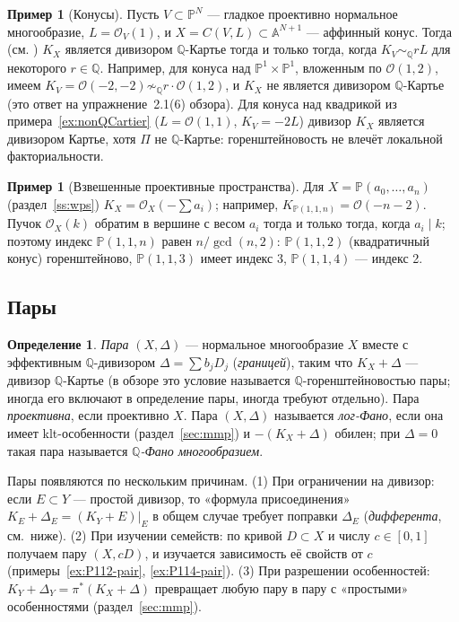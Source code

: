 \documentclass[11pt,a4paper]{article}
\theoremstyle{plain}
\theoremstyle{definition}
\newtheorem{definition}[theorem]{Определение}
\newtheorem{example}[theorem]{Пример}
\theoremstyle{remark}
\newcommand{\Q}{\mathbb{Q}}
\newcommand{\PP}{\mathbb{P}}
\newcommand{\A}{\mathbb{A}}
\newcommand{\cO}{\mathcal{O}}
\begin{document}
\begin{example}[Конусы]\label{ex:cone-canonical}
Пусть $V\subset\PP^N$ --- гладкое проективно нормальное многообразие, $L=\cO_V(1)$, и
$X=C(V,L)\subset\A^{N+1}$ --- аффинный конус. Тогда (см. \cite[3.1]{KolSing}) $K_X$ является
дивизором $\Q$-Картье тогда и только тогда, когда $K_V\sim_\Q rL$ для некоторого $r\in\Q$. Например,
для конуса над $\PP^1\times\PP^1$, вложенным по $\cO(1,2)$, имеем $K_V=\cO(-2,-2)\not\sim_\Q
r\cdot\cO(1,2)$, и $K_X$ не является дивизором $\Q$-Картье (это ответ на упражнение~2.1(6) обзора). Для конуса над
квадрикой из примера~\ref{ex:nonQCartier} ($L=\cO(1,1)$, $K_V=-2L$) дивизор $K_X$ является дивизором Картье,
хотя $\Pi$ не $\Q$-Картье: горенштейновость не влечёт локальной факториальности.
\end{example}

\begin{example}[Взвешенные проективные пространства]
Для $X=\PP(a_0,\dots,a_n)$ (раздел~\ref{ss:wps}) $K_X=\cO_X(-\sum a_i)$; например,
$K_{\PP(1,1,n)}=\cO(-n-2)$. Пучок $\cO_X(k)$ обратим в вершине с весом $a_i$ тогда и только тогда,
когда $a_i\mid k$; поэтому индекс $\PP(1,1,n)$ равен $n/\gcd(n,2)$: $\PP(1,1,2)$ (квадратичный
конус) горенштейново, $\PP(1,1,3)$ имеет индекс 3, $\PP(1,1,4)$ --- индекс 2.
\end{example}

\subsection{Пары}

\begin{definition}\label{def:pair}
\emph{Пара} $(X,\Delta)$ --- нормальное многообразие $X$ вместе с эффективным $\Q$-дивизором
$\Delta=\sum b_jD_j$ (\emph{границей}), таким что $K_X+\Delta$ --- дивизор $\Q$-Картье
(в обзоре это условие называется $\Q$-горенштейновостью пары; иногда его включают в определение
пары, иногда требуют отдельно). Пара \emph{проективна}, если проективно $X$. Пара $(X,\Delta)$
называется \emph{лог-Фано}, если она имеет klt-особенности (раздел~\ref{sec:mmp}) и
$-(K_X+\Delta)$ обилен; при $\Delta=0$ такая пара называется \emph{$\Q$-Фано многообразием}.
\end{definition}

Пары появляются по нескольким причинам. (1) При ограничении на дивизор: если $E\subset Y$ ---
простой дивизор, то «формула присоединения» $K_E+\Delta_E=(K_Y+E)|_E$ в общем случае требует
поправки $\Delta_E$ (\emph{дифферента}, см.~ниже). (2) При изучении семейств: по кривой $D\subset X$
и числу $c\in[0,1]$ получаем пару $(X,cD)$, и изучается зависимость её свойств от $c$
(примеры~\ref{ex:P112-pair}, \ref{ex:P114-pair}). (3) При разрешении особенностей:
$K_Y+\Delta_Y=\pi^*(K_X+\Delta)$ превращает любую пару в пару с «простыми» особенностями
(раздел~\ref{sec:mmp}).
\end{document}
